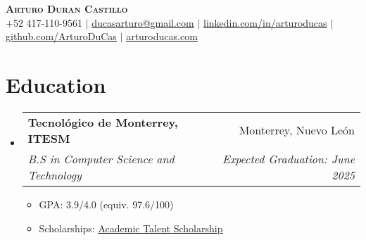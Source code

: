 \documentclass[letterpaper,11pt]{article}
\makeatletter
\newcommand{\resumeItem}[1]{
    \item\small{
            {#1 \vspace{-2pt}}
    }
}
\newcommand{\resumeSubheading}[4]{
    \vspace{-2pt}\item
    \begin{tabular*}{0.97\textwidth}[t]{l@{\extracolsep{\fill}}r}
        \textbf{#1} & #2 \\
        \textit{\small#3} & \textit{\small #4} \\
    \end{tabular*}\vspace{-7pt}
}
\newcommand{\resumeSubHeadingListStart}{\begin{itemize}[leftmargin=0.15in, label={}]}
\newcommand{\resumeSubHeadingListEnd}{\end{itemize}}
\newcommand{\resumeItemListStart}{\begin{itemize}}
\newcommand{\resumeItemListEnd}{\end{itemize}\vspace{-5pt}}
\makeatother
\begin{document}

\begin{center}
\textbf{\Huge \scshape Arturo Duran Castillo} \\ \vspace{1pt}
\small +52 417-110-9561 $|$ \href{mailto:ducasarturo@gmail.com}{\underline{ducasarturo@gmail.com}} $|$
\href{https://www.linkedin.com/in/arturoducas/}{\underline{linkedin.com/in/arturoducas}} $|$
\href{https://github.com/ArturoDuCas}{\underline{github.com/ArturoDuCas}} $|$
\href{https://personal-portfolio-indol-eta.vercel.app/}{\underline{arturoducas.com}}
\end{center}


\section{Education}
\resumeSubHeadingListStart
\resumeSubheading
{Tecnológico de Monterrey, ITESM}{Monterrey, Nuevo León}
{B.S in Computer Science and Technology}{Expected Graduation: June 2025}
\resumeItemListStart
\resumeItem{GPA: 3.9/4.0 (equiv. 97.6/100)}
\resumeItem{Scholarships: \href{https://drive.google.com/file/d/1b5jrPn-a_eLqLJsYaLeC222-oznbXLQm/view?usp=sharing}{\underline{Academic Talent Scholarship}}}
\resumeItemListEnd
\resumeSubHeadingListEnd



\end{document}
